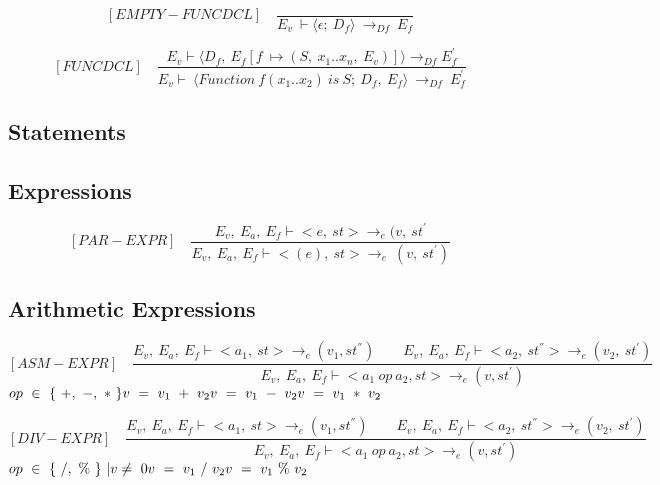    	\[
   	[EMPTY-FUNCDCL] \quad
   	\dfrac{}{E_v \ \vdash \langle \epsilon; \ D_f \rangle \ \rightarrow_{Df} \ E_f}
   	\]
   	
   	\[
   	[FUNCDCL] \quad
   	\dfrac{E_v \vdash \langle D_f, \ E_f[f \ \mapsto (S, \ x_1 .. x_n, \ E_v)] \rangle \rightarrow_{Df} E_f^{'}}{E_v \vdash \ \langle Function \ f(x_1 .. x_2) \ is \ S; \ D_f, \ E_f \rangle \ \rightarrow_{Df} \ E_f^{'}}
   	\]
   	\subsection{Statements}
   	
   	\subsection{Expressions}
   	
   	\[
   	[PAR-EXPR] \quad
   	\dfrac{E_v, \ E_a, \ E_f \vdash <e, \ st> \rightarrow_e (v, \ st^{'}}{E_v, \ E_a, \ E_f \vdash <(e), \ st> \rightarrow_e \ (v, \ st^{'})}
   	\]
   	
   	\subsection{Arithmetic Expressions}
   	
   	\[
   	[ASM-EXPR] \quad
   	\dfrac{E_v, \ E_a, \ E_f \vdash <a_1, \ st> \rightarrow_{e} (v_1, st^{''}) \qquad E_v, \ E_a, \ E_f \vdash <a_2, \ st^{''}> \rightarrow_e (v_2, \ st^{'})}{E_v, \ E_a, \ E_f \vdash <a_1 \ op \ a_2, st> \rightarrow_{e} (v, st^{'})}
   	\]
 	\begin{math}
 	op \ \in \ \{ \ +, \ -, \ * \ \} \newline
   	v \ = \ v_1 \ + \ v_2 \newline
   	v \ = \ v_1 \ - \ v_2 \newline
   	v \ = \ v_1 \ * \ v_2
   	\end{math}
   	
   	\[
   	[DIV-EXPR] \quad
   	\dfrac{E_v, \ E_a, \ E_f \vdash <a_1, \ st> \rightarrow_{e} (v_1, st^{''}) \qquad E_v, \ E_a, \ E_f \vdash <a_2, \ st^{''}> \rightarrow_e (v_2, \ st^{'})}{E_v, \ E_a, \ E_f \vdash <a_1 \ op \ a_2, st> \rightarrow_{e} (v, st^{'})}
   	\]
   	\begin{math}
   	op \ \in \ \{ \ /, \ \% \ \} \ | v \not= \ 0 \newline 
   	v \ = \ v_1 \ / \ v_2 \newline
   	v \ = \ v_1 \ \% \ v_2
   	\end{math}   	   	   	

